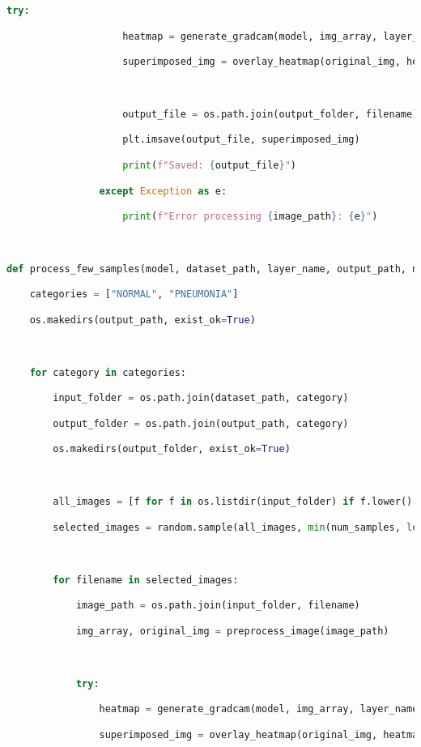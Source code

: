 \documentclass{article}
\begin{document}
\begin{lstlisting}[style=mystyle,language=Python]
                try:

                    heatmap = generate_gradcam(model, img_array, layer_name)

                    superimposed_img = overlay_heatmap(original_img, heatmap)



                    output_file = os.path.join(output_folder, filename)

                    plt.imsave(output_file, superimposed_img)

                    print(f"Saved: {output_file}")

                except Exception as e:

                    print(f"Error processing {image_path}: {e}")



def process_few_samples(model, dataset_path, layer_name, output_path, num_samples=5):

    categories = ["NORMAL", "PNEUMONIA"]

    os.makedirs(output_path, exist_ok=True)



    for category in categories:

        input_folder = os.path.join(dataset_path, category)

        output_folder = os.path.join(output_path, category)

        os.makedirs(output_folder, exist_ok=True)



        all_images = [f for f in os.listdir(input_folder) if f.lower().endswith(('.jpg', '.jpeg', '.png'))]

        selected_images = random.sample(all_images, min(num_samples, len(all_images)))



        for filename in selected_images:

            image_path = os.path.join(input_folder, filename)

            img_array, original_img = preprocess_image(image_path)



            try:

                heatmap = generate_gradcam(model, img_array, layer_name)

                superimposed_img = overlay_heatmap(original_img, heatmap)




\end{lstlisting}
\end{document}
